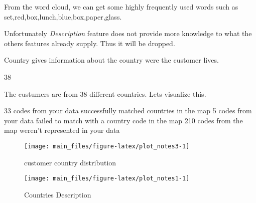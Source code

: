 From the word cloud, we can get some highly frequently used words such
as set,red,box,lunch,blue,box,paper,glass.

Unfortunately \emph{Description} feature does not provide more knowledge
to what the others features already supply. Thus it will be dropped.

Country gives information about the country were the customer lives.

\begin{Schunk}
\begin{Soutput}
[1] 38
\end{Soutput}
\end{Schunk}

The custumers are from 38 different countries. Lets visualize this.

\begin{Schunk}
\begin{Soutput}
33 codes from your data successfully matched countries in the map
5 codes from your data failed to match with a country code in the map
210 codes from the map weren't represented in your data
\end{Soutput}
\begin{figure}[H]

{\centering \texttt{[image: main\_files/figure-latex/plot\_notes3-1]} 

}

\caption[customer country distribution]{customer country distribution}\label{fig:plot_notes3}
\end{figure}
\end{Schunk}

\begin{Schunk}
\begin{figure}[H]

{\centering \texttt{[image: main\_files/figure-latex/plot\_notes1-1]} 

}

\caption[Countries Description]{Countries Description}\label{fig:plot_notes1}
\end{figure}
\end{Schunk}

